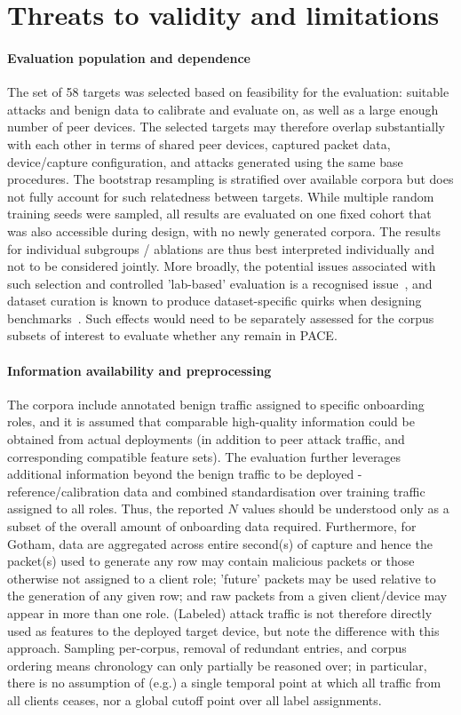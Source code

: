 \section{Threats to validity and limitations} 
\label{sec:limitations} 
\paragraph{Evaluation population and dependence} 
The set of 58 targets was selected based on feasibility for the evaluation: suitable attacks and benign data to calibrate and evaluate on, as well as a large enough number of peer devices. The selected targets may therefore overlap substantially with each other in terms of shared peer devices, captured packet data, device/capture configuration, and attacks generated using the same base procedures. The bootstrap resampling is stratified over available corpora but does not fully account for such relatedness between targets. While multiple random training seeds were sampled, all results are evaluated on one fixed cohort that was also accessible during design, with no newly generated corpora. The results for individual subgroups / ablations are thus best interpreted individually and not to be considered jointly. More broadly, the potential issues associated with such selection and controlled 'lab-based' evaluation is a recognised issue~\cite{arp2024pitfalls}, and dataset curation is known to produce dataset-specific quirks when designing benchmarks~\cite{flood2024smells}. Such effects would need to be separately assessed for the corpus subsets of interest to evaluate whether any remain in PACE.

\paragraph{Information availability and preprocessing} 
The corpora include annotated benign traffic assigned to specific onboarding roles, and it is assumed that comparable high-quality information could be obtained from actual deployments (in addition to peer attack traffic, and corresponding compatible feature sets). The evaluation further leverages additional information beyond the benign traffic to be deployed - reference/calibration data and combined standardisation over training traffic assigned to all roles. Thus, the reported $N$ values should be understood only as a subset of the overall amount of onboarding data required. Furthermore, for Gotham, data are aggregated across entire second(s) of capture and hence the packet(s) used to generate any row may contain malicious packets or those otherwise not assigned to a client role; 'future' packets may be used relative to the generation of any given row; and raw packets from a given client/device may appear in more than one role. (Labeled) attack traffic is not therefore directly used as features to the deployed target device, but note the difference with this approach. Sampling per-corpus, removal of redundant entries, and corpus ordering means chronology can only partially be reasoned over; in particular, there is no assumption of (e.g.) a single temporal point at which all traffic from all clients ceases, nor a global cutoff point over all label assignments.

